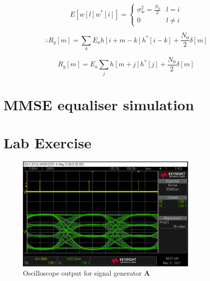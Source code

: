 \documentclass[11pt]{article}
\begin{document}
\begin{equation}
    E \left[w[l]w^*[i]\right] =
    \begin{cases}
        \sigma^2_w = \frac{N_0}{2} & l = i    \\
        0                          & l \neq i
    \end{cases}
\end{equation}

\begin{equation}
    \therefore R_y[m] = \sum_k E_a h[i+m-k]h^*[i-k]+\frac{N_0}{2}\delta[m]
\end{equation}

\begin{equation}
    R_y[m] = E_a \sum_j h[m+j]h^*[j]+\frac{N_0}{2}\delta[m]
\end{equation}

\section{MMSE equaliser simulation}
\section{Lab Exercise}
\begin{figure}[H]
    \centering
    \includegraphics[width=0.8\textwidth]{scope.png}
    \caption{Oscilloscope output for signal generator \textbf{A}\label{scope}}
\end{figure}
\end{document}

